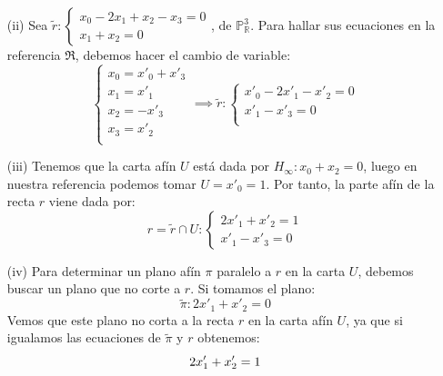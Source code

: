 {\begin{enumerate}
        Obteniendo así las matrices de cambio de base:
        \[
        C_{\mathfrak{R}, \mathfrak{R}_C} = 
        C_{B,B_C} =
        \begin{pmatrix}
        1 & 0 & 0 & 1 \\
        0 & 1 & 0 & 0 \\
        0 & 0 & 0 & -1 \\
        0 & 0 & 1 & 0
        \end{pmatrix}
        \]
        \item[(ii)] Sea $\tilde{r} : \begin{cases}x_0 - 2x_1 + x_2 - x_3 = 0 \\ x_1 + x_2 = 0 \end{cases}$, de $\mathbb{P}^3_{\mathbb{R}}$. Para hallar sus ecuaciones en la referencia $\mathfrak{R}$, debemos hacer el cambio de variable:
        \[
        \begin{cases}
            x_0 = x'_0 + x'_3 \\
            x_1 = x'_1 \\
            x_2 = -x'_3\\
            x_3 = x'_2 \\
        \end{cases}
        \implies
        \tilde{r} :
        \begin{cases}
            x'_0 -2x'_1 - x'_2 = 0 \\
            x'_1 - x'_3 = 0\\
        \end{cases}
        \]
        \item[(iii)] Tenemos que la carta afín $U$ está dada por $H_\infty : x_0 + x_2 = 0$, luego en nuestra referencia podemos tomar $U = x'_0 = 1$. Por tanto, la parte afín de la recta $r$ viene dada por:
        \[
        r = \tilde{r} \cap U :
        \begin{cases}
            2x'_1 + x'_2 = 1 \\
            x'_1 - x'_3 = 0
        \end{cases}
        \]
        \item[(iv)] Para determinar un plano afín $\pi$ paralelo a $r$ en la carta $U$, debemos buscar un plano que no corte a $r$. Si tomamos el plano:
        \[
        \tilde{\pi} : 2x'_1 + x'_2 = 0
        \]
        Vemos que este plano no corta a la recta $r$ en la carta afín $U$, ya que si igualamos las ecuaciones de $\tilde{\pi}$ y $r$ obtenemos:
        \[
            2x'_1 + x'_2 = 1 \\
\]
\end{enumerate}}
